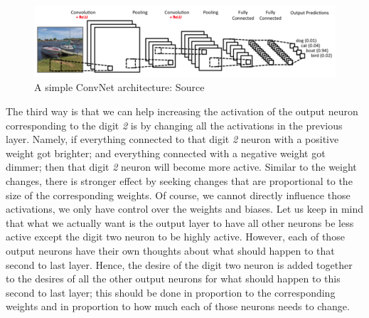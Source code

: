 \documentclass[master]{thesis-uestc}
\begin{document}
\begin{figure}[ht]
\includegraphics[width=5in]{pic/ConvNet_Arch.png}
\caption{A simple ConvNet architecture: Source }
\label{ConvNet_arch}
\end{figure}

The third way is that we can help increasing the activation of the output neuron corresponding to the digit \textit{2} is by changing all the activations in the previous layer. Namely, if everything connected to that digit \textit{2} neuron with a positive weight got brighter; and everything connected with a negative weight got dimmer; then that digit \textit{2} neuron will become more active. Similar to the weight changes, there is stronger effect by seeking changes that are proportional to the size of the corresponding weights. Of course, we cannot directly influence those activations, we only have control over the weights and biases. Let us keep in mind that what we actually want is the output layer to have all other neurons be less active except the digit two neuron to be highly active. However, each of those output neurons have their own thoughts about what should happen to that second to last layer. Hence, the desire of the digit two neuron is added together to the desires of all the other output neurons for what should happen to this second to last layer; this should be done in proportion to the corresponding weights and in proportion to how much each of those neurons needs to change.
\end{document}

